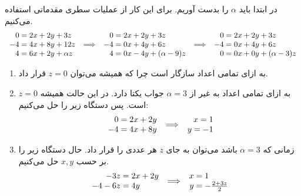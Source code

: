 \\
\\\noindent
در ابتدا باید
$\alpha$
را بدست آوریم. برای این کار از عملیات سطری مقدماتی استفاده می‌کنیم.
\begin{align*}
    \begin{array}{r@{\mskip\thickmuskip}l}
		0 &= 2x + 2y + 3z\\
		-4 &= 4x + 8y + 12z\\
		4 &= 6x + 2y + \alpha z
    \end{array}
    \implies
    \begin{array}{r@{\mskip\thickmuskip}l}
        0 &= 2x + 2y + 3z\\
        -4 &= 0x + 4y + 6z\\
        4 &= 0x - 4y + (\alpha - 9)z
    \end{array}
    \implies
    \begin{array}{r@{\mskip\thickmuskip}l}
        0 &= 2x + 2y + 3z\\
        -4 &= 0x + 4y + 6z\\
        0 &= 0x + 0y + (\alpha - 3)z
    \end{array}
\end{align*}
\begin{enumerate}[wide, labelwidth=!, labelindent=0pt]
    \item به ازای تمامی اعداد سازگار است چرا که همیشه می‌توان $z=0$ قرار داد.
    \item به ازای تمامی اعداد به غیر از $\alpha = 3$ جواب یکتا دارد.
در این حالت همیشه
$z = 0$
است. پس دستگاه زیر را حل می‌کنیم:
\begin{align*}
    \begin{array}{r@{\mskip\thickmuskip}l}
		0 &= 2x + 2y\\
		-4 &= 4x + 8y\\
    \end{array}
    \implies
    \begin{array}{r@{\mskip\thickmuskip}l}
        x = 1\\
        y = -1
    \end{array}
\end{align*}
    \item زمانی که $\alpha = 3$ باشد می‌توان به جای $z$ هر عددی را قرار داد. حال دستگاه زیر را بر حسب $x, y$ حل می‌کنیم.
\begin{align*}
    \begin{array}{r@{\mskip\thickmuskip}l}
		-3z &= 2x + 2y\\
        -4 - 6z &= 4y
    \end{array}
    \implies
    \begin{array}{r@{\mskip\thickmuskip}l}
        x &= 1\\
        y &= -\frac{2 + 3z}{2}
    \end{array}
\end{align*}
\end{enumerate}